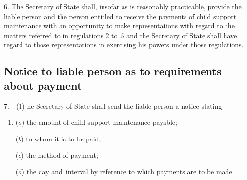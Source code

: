 \documentclass[12pt,a4paper]{article}
\begin{document}
6.  The Secretary of State shall, insofar as is reasonably practicable, provide the liable person and the person entitled to receive the payments of child support maintenance with an opportunity to make representations with regard to the matters referred to in regulations 2 to~5 and the Secretary of State shall have regard to those representations in exercising his powers under those regulations.

\subsection[7. Notice to liable person as to requirements about payment]{Notice to liable person as to requirements about payment}

7.—(1) 
he  %
Secretary of State shall send the liable person a notice stating—
\begin{enumerate}\item[]
($a$) the amount of child support maintenance payable;

($b$) to whom it is to be paid;

($c$) the method of payment; 

($d$) the day and~interval by reference to which payments are to be made.
\end{enumerate}

\end{document}
